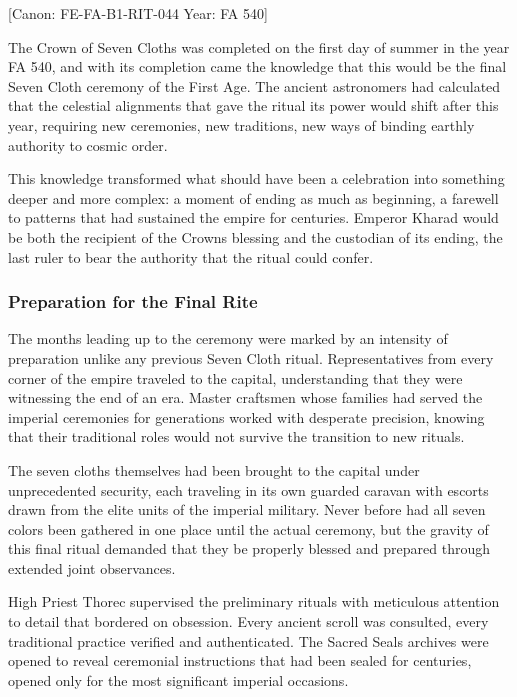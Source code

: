 {[}Canon: FE-FA-B1-RIT-044 \textbar{} Year: FA 540{]}

The Crown of Seven Cloths was completed on the first day of summer in
the year FA 540, and with its completion came the knowledge that this
would be the final Seven Cloth ceremony of the First Age. The ancient
astronomers had calculated that the celestial alignments that gave the
ritual its power would shift after this year, requiring new ceremonies,
new traditions, new ways of binding earthly authority to cosmic order.

This knowledge transformed what should have been a celebration into
something deeper and more complex: a moment of ending as much as
beginning, a farewell to patterns that had sustained the empire for
centuries. Emperor Kharad would be both the recipient of the
Crown\textquotesingle s blessing and the custodian of its ending, the
last ruler to bear the authority that the ritual could confer.

\subsubsection{Preparation for the Final
Rite}\label{preparation-for-the-final-rite}

The months leading up to the ceremony were marked by an intensity of
preparation unlike any previous Seven Cloth ritual. Representatives from
every corner of the empire traveled to the capital, understanding that
they were witnessing the end of an era. Master craftsmen whose families
had served the imperial ceremonies for generations worked with desperate
precision, knowing that their traditional roles would not survive the
transition to new rituals.

The seven cloths themselves had been brought to the capital under
unprecedented security, each traveling in its own guarded caravan with
escorts drawn from the elite units of the imperial military. Never
before had all seven colors been gathered in one place until the actual
ceremony, but the gravity of this final ritual demanded that they be
properly blessed and prepared through extended joint observances.

High Priest Thorec supervised the preliminary rituals with meticulous
attention to detail that bordered on obsession. Every ancient scroll was
consulted, every traditional practice verified and authenticated. The
Sacred Seal\textquotesingle s archives were opened to reveal ceremonial
instructions that had been sealed for centuries, opened only for the
most significant imperial occasions.

